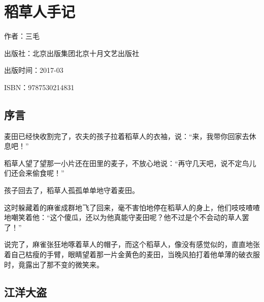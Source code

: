 


\section{稻草人手记}

\par 作者：三毛
\par 出版社：北京出版集团北京十月文艺出版社
\par 出版时间：2017-03
\par ISBN：9787530214831


\subsection{序言}

\par 麦田已经快收割完了，农夫的孩子拉着稻草人的衣袖，说：“来，我带你回家去休息吧！”
\par 稻草人望了望那一小片还在田里的麦子，不放心地说：“再守几天吧，说不定鸟儿们还会来偷食呢！”
\par 孩子回去了，稻草人孤孤单单地守着麦田。
\par 这时躲藏着的麻雀成群地飞了回来，毫不害怕地停在稻草人的身上，他们吱吱喳喳地嘲笑着他：“这个傻瓜，还以为他真能守麦田呢？他不过是个不会动的草人罢了！”
\par 说完了，麻雀张狂地啄着草人的帽子，而这个稻草人，像没有感觉似的，直直地张着自己枯瘦的手臂，眼睛望着那一片金黄色的麦田，当晚风拍打着他单薄的破衣服时，竟露出了那不变的微笑来。



\subsection{江洋大盗}

